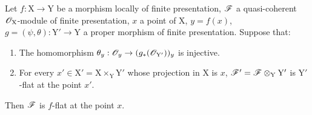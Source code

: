 \begin{proposition}[11.5.3]
\label{IV.11.5.3}
Let $f:\mathrm{X}\to\mathrm{Y}$ be a morphism locally of finite presentation,
$\mathscr{F}$ a quasi-coherent $\mathscr{O}_\mathrm{X}$-module of finite presentation, $x$ a point of $\mathrm{X}$, $y=f(x)$, $g=(\psi,\theta):\mathrm{Y}'\to\mathrm{Y}$
a proper morphism of finite presentation. Suppose that:
\begin{enumerate}[label=(\roman*)]
  \item The homomorphism $\theta_y:\mathscr{O}_y\to(g_*(\mathscr{O}_{\mathrm{Y}'}))_y$ is injective.
  \item For every $x'\in\mathrm{X}'=\mathrm{X}\times_\mathrm{Y}\mathrm{Y}'$ whose projection in $\mathrm{X}$ is $x$, $\mathscr{F}'=\mathscr{F}\otimes_\mathrm{Y}\mathrm{Y}'$ is
  $\mathrm{Y}'$-flat at the point $x'$.
\end{enumerate}

Then $\mathscr{F}$ is $f$-flat at the point $x$.
\end{proposition}

